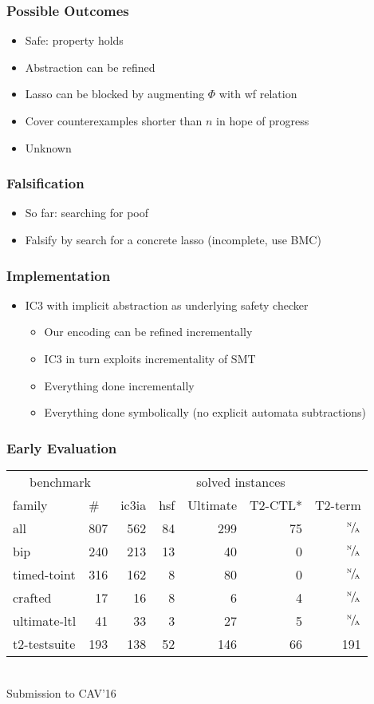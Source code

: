 \documentclass[d3s,tikz]{beamer}
\begin{document}
\begin{frame}
\frametitle{Possible Outcomes}
\begin{itemize}
\item Safe: property holds
\item Abstraction can be refined
\item Lasso can be blocked by augmenting $\Phi$ with wf relation
\item Cover counterexamples shorter than $n$ in hope of progress
\item Unknown
\end{itemize}
\end{frame}
\subtitleframe{}
\begin{frame}
\frametitle{Falsification}
\begin{itemize}
\item So far: searching for poof
\item Falsify by search for a concrete lasso (incomplete, use BMC)
\end{itemize}
\end{frame}
\subtitleframe{}
\begin{frame}
\frametitle{Implementation}
\begin{itemize}
\item IC3 with implicit abstraction as underlying safety checker
\begin{itemize}
\item Our encoding can be refined incrementally
\item IC3 in turn exploits incrementality of SMT
\item Everything done incrementally
\item Everything done symbolically (no explicit automata subtractions)
\end{itemize}
\end{itemize}
\end{frame}
\subtitleframe{}
\begin{frame}
\frametitle{Early Evaluation}
\centering
\def\us{\cellcolor{blue!100}}
\def\na{\color{darkgray}$^\text{\tiny N}\!/\!_\text{\tiny A}$}
\def\sum{\cellcolor{gray}}
\begin{tabular}{lr | r r r r r}
\multicolumn{2}{c|}{benchmark} & \multicolumn{5}{c}{solved instances} \\
\multicolumn{1}{l}{family} & \multicolumn{1}{l|}{\#} & \multicolumn{1}{l}{\us ic3ia} & \multicolumn{1}{l}{hsf} & \multicolumn{1}{l}{Ultimate} & \multicolumn{1}{l}{T2-CTL*} & \multicolumn{1}{l}{T2-term} \\
\sum all & \sum 807 & \us 562 & \sum 84 & \sum 299 & \sum 75 & \sum \na \\
bip          & 240 & \us 213 & 13 &  40 &  0 & \na \\
timed-toint  & 316 & \us 162 &  8 &  80 &  0 & \na \\
crafted      &  17 & \us  16 &  8 &   6 &  4 & \na \\
ultimate-ltl &  41 & \us  33 &  3 &  27 &  5 & \na \\
t2-testsuite & 193 & \us 138 & 52 & 146 & 66 & 191 \\
\end{tabular} \\
\vskip1cm
Submission to CAV'16
\end{frame}
\end{document}
